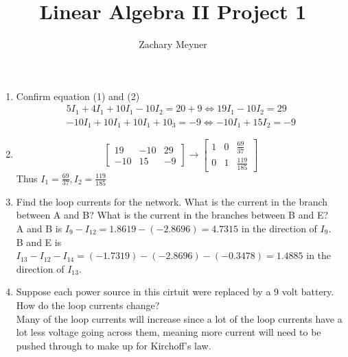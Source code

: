 \documentclass[12pt]{article}
\title{\large Linear Algebra II Project 1}
\author{\large Zachary Meyner}
\date{}
\begin{document}
\maketitle
\begin{enumerate}
    \item Confirm equation (1) and (2)
    \begin{gather}
        5I_1+4I_1+10I_1-10I_2=20+9 \Leftrightarrow 19I_1-10I_2=29 \\
        -10I_1+10I_1+10I_1+10_3=-9 \Leftrightarrow -10I_1+15I_2=-9
    \end{gather}
    \item \[
        \begin{bmatrix}
            19 & -10 & 29 \\
            -10 & 15 & -9
        \end{bmatrix} \rightarrow 
        \begin{bmatrix}
            1 & 0 & \displaystyle\frac{69}{37} \\
            0 & 1 & \displaystyle\frac{119}{185}
        \end{bmatrix}
    \]
    Thus $I_1=\displaystyle\frac{69}{37}, I_2=\displaystyle\frac{119}{185}$
    \item Find the loop currents for the network. What is the current in the branch between A 
    and B\@? What is the current in the branches between B and E\@? \\
    A and B is $I_9-I_{12}=1.8619-(-2.8696)=4.7315$ in the direction of $I_9$. \\
    B and E is $I_{13}-I_{12}-I_{14}=(-1.7319)-(-2.8696)-(-0.3478)=1.4885$ in the direction 
    of $I_{13}$. 
    \item Suppose each power source in this cirtuit were replaced by a 9 volt battery. How do 
    the loop currents change? \\
    Many of the loop currents will increase since a lot of the loop currents have a lot less 
    voltage going across them, meaning more current will need to be pushed through to 
    make up for Kirchoff's law.
\end{enumerate}
\end{document}
